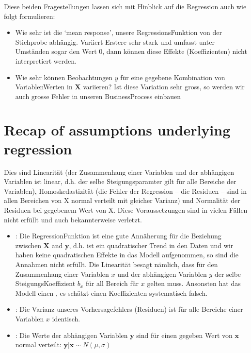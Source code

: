 \documentclass[letterpaper,10pt,english]{jupyterBook}
\begin{document}
\sphinxAtStartPar
Diese beiden Fragestellungen lassen sich mit Hinblick auf die Regression auch wie folgt formulieren:
\begin{itemize}
\item {} 
\sphinxAtStartPar
Wie sehr ist die ‘mean response’, unsere Regressions\sphinxhyphen{}Funktion von der Stichprobe abhängig. Variiert Erstere sehr stark und umfasst unter Umständen sogar den Wert \(0\), dann können diese Effekte (Koeffizienten) nicht interpretiert werden.

\item {} 
\sphinxAtStartPar
Wie sehr können Beobachtungen \(y\) für eine gegebene Kombination von Variablen\sphinxhyphen{}Werten in \(\mathbf{X}\) variieren? Ist diese Variation sehr gross, so werden wir auch grosse Fehler in unseren Business\sphinxhyphen{}Process einbauen

\end{itemize}


\section{Recap of assumptions underlying regression}
\label{\detokenize{Regression_Techniques:recap-of-assumptions-underlying-regression}}
\sphinxAtStartPar
Dies sind Linearität (der Zusammenhang einer Variablen und der abhängigen Variablen ist linear, d.h. der selbe Steigungsparamter gilt für alle Bereiche der Variablen), Homoskedastizität (die Fehler der Regression – die Residuen – sind in allen Bereichen von X normal verteilt mit gleicher Varianz) und Normalität der Residuen bei gegebenem Wert von X.
Diese Voraussetzungen sind in vielen Fällen nicht erfüllt und auch bekannterweise verletzt.
\begin{itemize}
\item {} 
\sphinxAtStartPar
{}: Die Regression\sphinxhyphen{}Funktion ist eine gute Annäherung für die Beziehung zwischen \(\mathbf{X}\) and \(\mathbf{y}\), d.h. ist ein quadratischer Trend in den Daten und wir haben keine quadratischen Effekte in das Modell aufgenommen, so sind die Annahmen nicht erfüllt. Die Linearität besagt nämlich, dass für den Zusammenhang einer Variablen \(x\) und der abhängigen Variablen \(y\) der selbe Steigungs\sphinxhyphen{}Koeffizient \(b_x\) für all Bereich für \(x\) gelten muss. Ansonsten hat das Modell einen , es schätzt einen Koeffizienten systematisch falsch.

\item {} 
\sphinxAtStartPar
{}: Die Varianz unseres Vorhersagefehlers (Residuen) ist für alle Bereiche einer Variablen \(x\) identisch.

\item {} 
\sphinxAtStartPar
{}: Die Werte der abhängigen Variablen \(\mathbf{y}\) sind für einen gegeben Wert von \(\mathbf{x}\) normal verteilt: \(\mathbf{y}|\mathbf{x} \sim N(\mu, \sigma)\)

\end{itemize}
\end{document}
